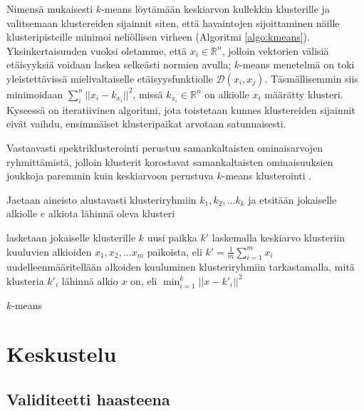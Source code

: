 \documentclass[finnish,gradu,twoside,12pt]{tktltiki}
\begin{document}
{Nimensä mukaisesti $k$-means löytämään keskiarvon kullekkin klusterille ja valitsemaan klustereiden sijainnit siten, että havaintojen sijoittaminen näille klusteripisteille minimoi neliöllisen virheen (Algoritmi \ref{algo:kmeans}). Yksinkertaisuuden vuoksi oletamme, että $x_i \in \mathbb{R}^n$, jolloin vektorien välisiä etäisyyksiä voidaan laskea selkeästi normien avulla; $k$-means menetelmä on toki yleistettävissä mielivaltaiselle etäisyysfunktiolle $\mathcal{D}(x_i, x_j)$. Täsmällisemmin siis minimoidaan $\sum_i^n ||x_i - k_{x_i}||^2$, missä $k_{x_i} \in \mathbb{R}^n$ on alkiolle $x_i$ määrätty klusteri. Kyseessä on iteratiivinen algoritmi, jota toistetaan kunnes klustereiden sijainnit eivät vaihdu, ensimmäiset klusteripaikat arvotaan satunnaisesti.

Vastaavasti spektriklusterointi perustuu samankaltaisten ominaisarvojen ryhmittämistä, jolloin klusterit korostavat samankaltaisten ominaisuuksien joukkoja paremmin kuin keskiarvoon perustuva $k$-means klusterointi \citep[485--586]{Hastie2009}.

\begin{algorithm}
\begin{algorithmic}

\State Jaetaan aineisto alustavasti klusteriryhmiin $k_1, k_2, \ldots k_k$ ja etsitään jokaiselle alkiolle $e$ alkiota lähinnä oleva klusteri


\State lasketaan jokaiselle klusterille $k$ uusi paikka $k'$ laskemalla keskiarvo klusteriin kuuluvien alkioiden $x_{1}, x_{2}, \ldots x_{m}$ paikoista, eli $k' = \frac{1}{m} \sum_{i=1}^m x_i $
\State uudelleenmääritellään alkoiden kuuluminen klusteriryhmiin tarkastamalla, mitä klusteria $k'_i$ lähinnä alkio $x$ on, eli $\min_{i=1}^k || x - k'_i || ^ 2$

\EndWhile

\end{algorithmic}
\caption{$k$-means}
\label{algo:kmeans}
\end{algorithm}


\section{Keskustelu}

\subsection{Validiteetti haasteena}

}
\end{document}
